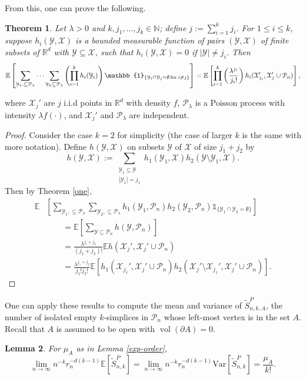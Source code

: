 \documentclass{amsart}
\newtheorem{thm}{Theorem}[section]
\newtheorem{lemma}[thm]{Lemma}
\theoremstyle{definition}
\newcommand{\R}{\mathbb{R}}
\newcommand{\E}{\mathbb{E}}
\newcommand{\N}{\mathbb{N}}
\newcommand{\vol}{\mathop{\mathrm{vol}}}
\newcommand{\X}{\mathcal{X}}
\newcommand{\Y}{\mathcal{Y}}
\newcommand{\var}{\mathrm{Var}}
\newcommand{\s}{\widetilde{S}}
\newcommand{\p}{\mathcal{P}}
\renewcommand{\1}{\mathbb{1}}
\begin{document}
From this, one can prove the following.
\begin{thm}\label{product}
Let $\lambda>0$ and $k,j_1,\ldots,j_k\in\N$; define $j:=\sum_{i=1}^kj_i$.  
For $1\le i\le k$, suppose
$h_i(\Y,\X)$ is a bounded measurable function of pairs $(\Y,\X)$ of
finite subsets of $\R^d$ with $\Y\subseteq\X$, such that $h_i(\Y,\X)=0$
if $|\Y|\neq j_i$.  Then
$$\E\left[\sum_{\Y_1,\subseteq\p_\lambda}\cdots\sum_{\Y_k\subseteq\p_\lambda}\left(
\prod_{i=1}^kh_i(\Y_i)\right)\1_{\{\Y_i\cap\Y_j=\emptyset\,{\rm for }\,
i\neq j\}}\right]=\E\left[\prod_{i=1}^k\left(\frac{\lambda^{j_i}}{j_i!}\right)
h_i(\X_{j_i}',\X_j'\cup\p_n)\right],$$
\end{thm}
where $\X_j'$ are $j$ i.i.d points in $\R^d$ with density $f$,  $\p_\lambda$
is a Poisson process with intensity $\lambda f(\cdot)$, and $\X_j'$ and 
$\p_\lambda$ are  independent.

\begin{proof}
Consider the case $k=2$ for simplicity (the case of larger $k$ is the same
with more notation).  Define $h(\Y,\X)$ on subsets $\Y$ of $\X$ 
of size $j_1+j_2$ by
$$h(\Y,\X):=\sum_{\substack{\Y_1\subseteq\Y\\|\Y_1|=j_1}}
h_1(\Y_1,\X)h_2(\Y\setminus\Y_1,\X).$$
Then by Theorem \ref{one},
\begin{equation*}\begin{split}
\E&\left[\sum_{\Y_1,\subseteq\p_\lambda}\sum_{\Y_2,\subseteq\p_\lambda}h_1(\Y_1,\p_n)
h_2(\Y_2,\p_n)\1_{\{\Y_1\cap\Y_2=\emptyset\}}\right]\\
&\qquad=\E\left[\sum_{\Y\subseteq\p_n}
h(\Y,\p_n)\right]\\&\qquad=\frac{\lambda^{j_1+j_2}}{(j_1+j_2)!}\E h(\X_j',\X_j'\cup
\p_n)\\&\qquad=\frac{\lambda^{j_1+j_2}}{j_1!j_2!}\E\left[h_1(\X_{j_1}',\X_j'\cup\p_n)h_2
(\X_j'\setminus\X_{j_1}',\X_j'\cup\p_n)\right].
\end{split}\end{equation*}

\end{proof}

\medskip

One can apply these results to compute the mean and variance of $\s_{n,k,A}^P$, the number of isolated
empty $k$-simplices in $\p_n$ whose left-most vertex is in the set $A$.
Recall that 
$A$ is assumed to be open
with $\vol(\partial A)=0$.  

\begin{lemma}\label{CC_Poisson_means}
For $\mu_A$ as in Lemma \ref{exp-order},
$$\lim_{n\to\infty}n^{-k}r_n^{-d(k-1)}\E\left[\s_{n,k}^P\right]=
\lim_{n\to\infty}n^{-k}r_n^{-d(k-1)}\var\left[\s_{n,k}^P\right]=\frac{\mu_A}{k!}.$$
\end{lemma}
\end{document}
